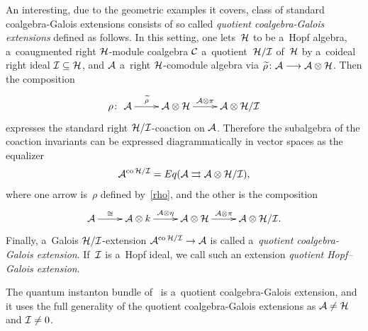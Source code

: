 \documentclass[11pt]{article}
\numberwithin{equation}{section}
\DeclareMathOperator{\co}{co}
\begin{document}
An interesting, due to the geometric examples it covers, class of standard coalgebra-Galois extensions consists of so
called \emph{quotient coalgebra-Galois extensions} def\/ined as follows.
In this setting, one lets~${\cal H}$ to be a~Hopf algebra, a~coaugmented right ${\cal H}$-module coalgebra ${\cal C}$
a~quotient~${\cal H}/{\cal I}$ of~${\cal H}$ by a~coideal right ideal ${\cal I} \subseteq {\cal H}$, and ${\cal A}$
a~right ${\cal H}$-comodule algebra via $\widetilde{\rho}\colon {\cal A} \longrightarrow {\cal A} \otimes {\cal H}$.
Then the composition
\begin{gather}
\label{rho}
\xymatrix{
\rho\colon \ {\cal A} \ar[r]^-{\widetilde{\rho}}&{\cal A} \otimes {\cal H} \ar[r]^-{{\cal A} \otimes\pi}&{\cal A} \otimes {\cal H}/{\cal I}}
\end{gather}
expresses the standard right ${\cal H}/{\cal I}$-coaction on ${\cal A}$.
Therefore the subalgebra of the coaction invariants can be expressed diagrammatically in vector spaces as the equalizer
\begin{gather}
\label{diageq}
{\cal A}^{\co{\cal H}/{\cal I}}={\rm Eq}({\cal A}\rightrightarrows {\cal A}\otimes{\cal H}/{\cal I}),
\end{gather}
where one arrow is~$\rho$ def\/ined by~\eqref{rho}, and the other is the composition
\begin{gather*}%
\xymatrix{{\cal A} \ar[r]^-{\cong}&{\cal A} \otimes k\ar[r]^-{{\cal A} \otimes\eta}&{\cal A} \otimes {\cal
H}\ar[r]^-{{\cal A} \otimes\pi} &  {\cal A} \otimes {\cal H}/{\cal I}.}
\end{gather*}
Finally, a~Galois ${\cal H}/{\cal I}$-extension ${\cal A}^{\co {\cal H}/{\cal I}} \to {\cal A}$ is called
a~\emph{quotient coalgebra-Galois extension}.
If~${\cal I}$ is a~Hopf ideal, we call such an extension \emph{quotient Hopf--Galois extension}.

The quantum instanton bundle of~\cite{BoneCiccDabrTarl04,BoneCiccTarl02} is a~quotient coalgebra-Galois extension, and
it uses the full generality of the quotient coalgebra-Galois extensions as ${\cal A} \neq {\cal H}$ and ${\cal I} \neq 0$.
\end{document}
